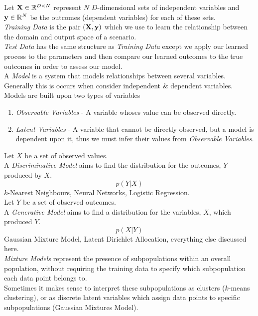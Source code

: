 \documentclass[11pt,a4paper]{article}
\begin{document}

Let $\textbf{X}\in\mathbb{R}^{D\times N}$ represent $N$ $D$-dimensional sets of independent variables and $\textbf{y}\in\mathbb{R}^N$ be the outcomes (dependent variables) for each of these sets.\\
\textit{Training Data} is the pair $(\textbf{X},\textbf{y})$ which we use to learn the relationship between the domain and output space of a scenario.\\
\nb \textit{Test Data} has the same structure as \textit{Training Data} except we apply our learned process to the parameters and then compare our learned outcomes to the true outcomes in order to assess our model.\\

A \textit{Model} is a system that models relationships between several variables. Generally this is occurs when consider independent \& dependent variables.\\
Models are built upon two types of variables
\begin{enumerate}
	\item \textit{Observable Variables} - A variable whoses value can be observed directly.
	\item \textit{Latent Variables} - A variable that cannot be directly observed, but a model is dependent upon it, thus we must infer their values from \textit{Observable Variables}.
\end{enumerate}

Let $X$ be a set of observed values.\\
A \textit{Discriminative Model} aims to find the distribution for the outcomes, $Y$ produced by $X$.
$$p(Y|X)$$
\eg $k$-Nearest Neighbours, Neural Networks, Logistic Regression.\\

Let $Y$ be a set of observed outcomes.\\
A \textit{Generative Model} aims to find a distribution for the variables, $X$, which produced $Y$.
$$p(X|Y)$$
\eg Gaussian Mixture Model, Latent Dirichlet Allocation, everything else discussed here.\\

\textit{Mixture Models} represent the presence of subpopulations within an overall population, without requiring the training data to specify which subpopulation each data point belongs to.\\
Sometimes it makes sense to interpret these subpopulations as clusters (\eg$k$-means clustering), or as discrete latent variables which assign data points to specific subpopulations (\eg Gaussian Mixtures Model).
\end{document}
